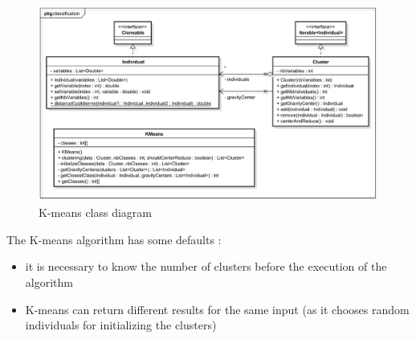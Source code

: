 \begin{figure}[h]
	\centering 
	\includegraphics[width=1\textwidth]{images/diagrams/class_diagram_kmeans}
	\caption{K-means class diagram}
	\label{fig:diagram:class:kmeans}
\end{figure}



The K-means \gls{algorithm} has some defaults : 
\begin{itemize}
	\item it is necessary to know the number of clusters before the execution of the \gls{algorithm}
	\item K-means can return different results for the same input (as it chooses random \glspl{individual} for initializing the \glspl{cluster})
\end{itemize}





